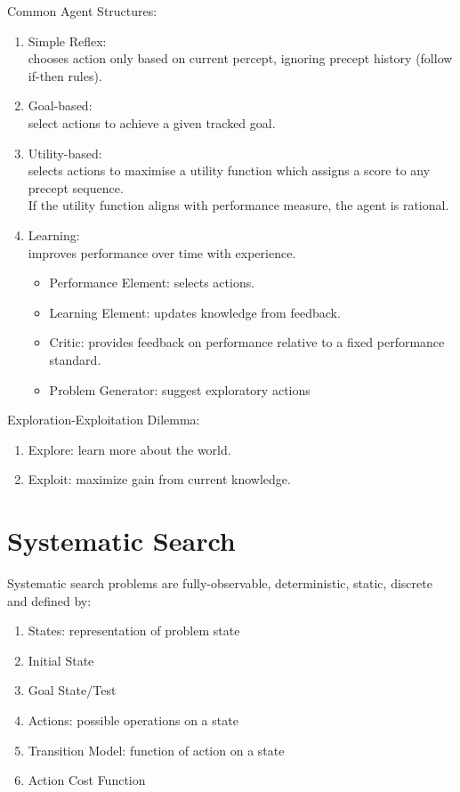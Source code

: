 \documentclass[12pt, a4paper]{article}
\begin{document}
\begin{multicols*}{3}
Common Agent Structures:
\begin{enumerate}[\roman*.]
  \item Simple Reflex:\\ chooses action only based on current percept, ignoring precept history (follow if-then rules).
  \item Goal-based:\\select actions to achieve a given tracked goal.
  \item Utility-based:\\selects actions to maximise a utility function which assigns a score to any precept sequence.\\If the utility function aligns with performance measure, the agent is rational.
  \item Learning:\\improves performance over time with experience.
    \begin{itemize}[leftmargin=*]\vspace{3pt}
      \item Performance Element: selects actions.
      \item Learning Element: updates knowledge from feedback. 
      \item Critic: provides feedback on performance relative to a fixed performance standard.
      \item Problem Generator: suggest exploratory actions
    \end{itemize}
\end{enumerate}

Exploration-Exploitation Dilemma:
\begin{enumerate}[\roman*.]
  \item Explore: learn more about the world.
  \item Exploit: maximize gain from current knowledge.
\end{enumerate}

\section{Systematic Search}

Systematic search problems are fully-observable, deterministic, static, discrete and defined by:
\begin{enumerate}[\roman*.]
  \item States: representation of problem state 
  \item Initial State 
  \item Goal State/Test 
  \item Actions: possible operations on a state
  \item Transition Model: function of action on a state
  \item Action Cost Function
\end{enumerate}
\vspace{-1em}
\colbreak

\end{multicols*}
\end{document}
